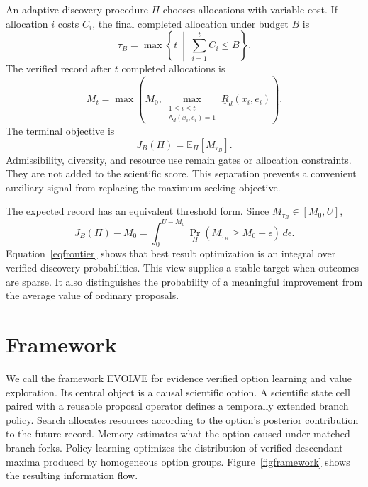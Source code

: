 \documentclass{article}
\newcommand{\lcb}{\underline{R}}
\newcommand{\admit}{\mathsf{A}}
\begin{document}
An adaptive discovery procedure $\Pi$ chooses allocations with variable cost. If allocation $i$ costs $C_i$, the final completed allocation under budget $B$ is
\begin{equation}
\tau_B
=
\max\left\{
t
\ \middle|\ 
\sum_{i=1}^{t}C_i\leq B
\right\}.
\label{eqstopping}
\end{equation}
The verified record after $t$ completed allocations is
\begin{equation}
M_t
=
\max\left(
M_0,
\max_{\substack{1\leq i\leq t\\\admit_d(x_i,e_i)=1}}
\lcb_d(x_i,e_i)
\right).
\label{eqrecord}
\end{equation}
The terminal objective is
\begin{equation}
J_B(\Pi)
=
\mathbb E_{\Pi}\left[M_{\tau_B}\right].
\label{eqobjective}
\end{equation}
Admissibility, diversity, and resource use remain gates or allocation constraints. They are not added to the scientific score. This separation prevents a convenient auxiliary signal from replacing the maximum seeking objective.

The expected record has an equivalent threshold form. Since $M_{\tau_B}\in[M_0,U]$,
\begin{equation}
J_B(\Pi)-M_0
=
\int_{0}^{U-M_0}
\Pr_{\Pi}\!\left(
M_{\tau_B}\geq M_0+\epsilon
\right)
\,d\epsilon.
\label{eqfrontier}
\end{equation}
Equation~\eqref{eqfrontier} shows that best result optimization is an integral over verified discovery probabilities. This view supplies a stable target when outcomes are sparse. It also distinguishes the probability of a meaningful improvement from the average value of ordinary proposals.

\section{Framework}
\label{secframework}

We call the framework EVOLVE for evidence verified option learning and value exploration. Its central object is a causal scientific option. A scientific state cell paired with a reusable proposal operator defines a temporally extended branch policy. Search allocates resources according to the option's posterior contribution to the future record. Memory estimates what the option caused under matched branch forks. Policy learning optimizes the distribution of verified descendant maxima produced by homogeneous option groups. Figure~\ref{figframework} shows the resulting information flow.
\end{document}
